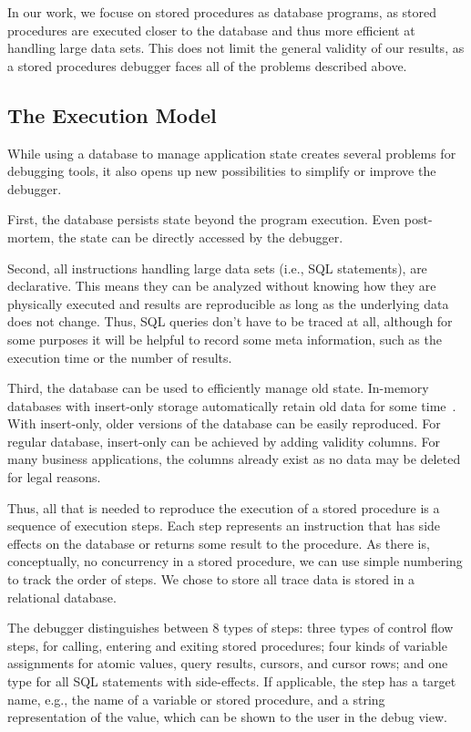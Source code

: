 \documentclass[english]{sig-alternate-05-2015}
\newcommand{\todo}[2][]{\pdfmargincomment[author={#1}]{#2}}
\begin{document}
In our work, we focuse on stored procedures as database programs, as stored procedures are executed closer to the database and thus more efficient at handling large data sets.
This does not limit the general validity of our results, as a stored procedures debugger faces all of the problems described above.

\subsection{The Execution Model}

While using a database to manage application state creates several problems for debugging tools, it also opens up new possibilities to simplify or improve the debugger.

First, the database persists state beyond the program execution.
Even post-mortem, the state can be directly accessed by the debugger.

Second, all instructions handling large data sets (i.e., SQL statements), are declarative.
This means they can be analyzed without knowing how they are physically executed and results are reproducible as long as the underlying data does not change.
Thus, SQL queries don't have to be traced at all, although for some purposes it will be helpful to record some meta information, such as the execution time or the number of results.\todo{MP: This is not clear to me, yet.}

Third, the database can be used to efficiently manage old state.
In-memory databases with insert-only storage automatically retain old data for some time~\cite{Plattner2009Acd}.
With insert-only, older versions of the database can be easily reproduced.
For regular database, insert-only can be achieved by adding validity columns.
For many business applications, the columns already exist as no data may be deleted for legal reasons.

Thus, all that is needed to reproduce the execution of a stored procedure is a sequence of execution steps.
Each step represents an instruction that has side effects on the database or returns some result to the procedure.
As there is, conceptually, no concurrency in a stored procedure, we can use simple numbering to track the order of steps.
We chose to store all trace data is stored in a relational database.

The debugger distinguishes between 8 types of steps:
three types of control flow steps, for calling, entering and exiting stored procedures;
four kinds of variable assignments for atomic values, query results, cursors, and cursor rows;
and one type for all SQL statements with side-effects.
If applicable, the step has a target name, e.g., the name of a variable or stored procedure, and a string representation of the value, which can be shown to the user in the debug view.
\end{document}
